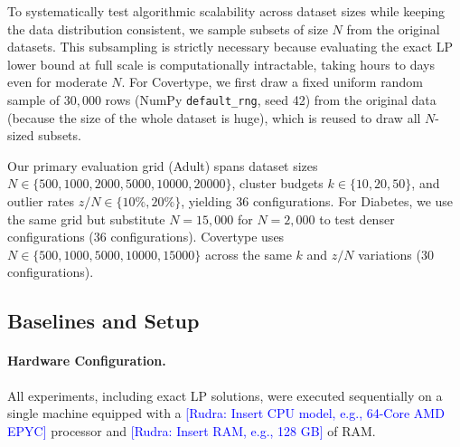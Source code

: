 \documentclass[twoside,leqno,twocolumn]{article}
\begin{document}
\begin{table}[h]
\caption{Datasets used in experiments. All numerical features are $z$-score standardized.}
\label{tab:datasets}
\centering
{}
\end{table}

To systematically test algorithmic scalability across dataset sizes while keeping the data distribution consistent, we sample subsets of size $N$ from the original datasets. This subsampling is strictly necessary because evaluating the exact LP lower bound at full scale is computationally intractable, taking hours to days even for moderate $N$. For Covertype, we first draw a fixed uniform random sample of $30{,}000$ rows (NumPy \texttt{default\_rng}, seed 42) from the original data (because the size of the whole dataset is huge), which is reused to draw all $N$-sized subsets.

Our primary evaluation grid (Adult) spans dataset sizes $N \in \{500, 1000, 2000, 5000, 10000, 20000\}$, cluster budgets $k \in \{10, 20, 50\}$, and outlier rates $z/N \in \{10\%, 20\%\}$, yielding 36 configurations. For Diabetes, we use the same grid but substitute $N=15{,}000$ for $N=2{,}000$ to test denser configurations (36 configurations). Covertype uses $N \in \{500, 1000, 5000, 10000, 15000\}$ across the same $k$ and $z/N$ variations (30 configurations).

\subsection{Baselines and Setup}

\paragraph{Hardware Configuration.}
All experiments, including exact LP solutions, were executed sequentially on a single machine equipped with a \textcolor{blue}{[Rudra: Insert CPU model, e.g., 64-Core AMD EPYC]} processor and \textcolor{blue}{[Rudra: Insert RAM, e.g., 128 GB]} of RAM.
\end{document}
